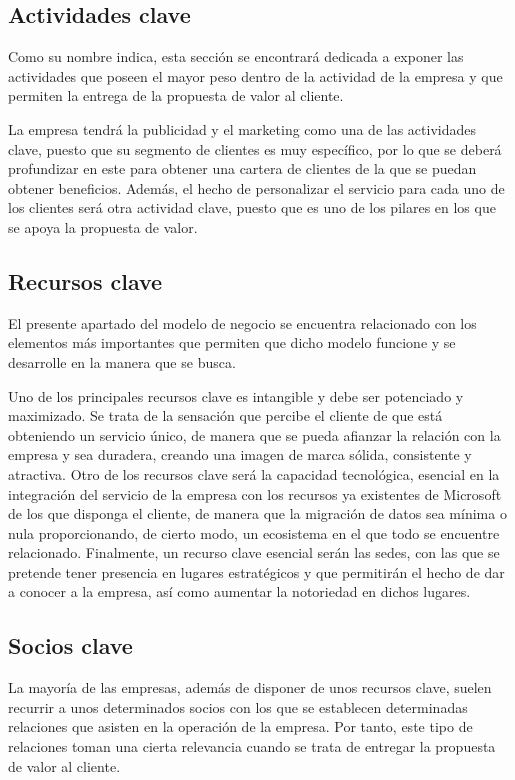 \subsection{Actividades clave}
Como su nombre indica, esta sección se encontrará dedicada a exponer las actividades que poseen el mayor peso dentro de la actividad de la empresa y que permiten la entrega de la propuesta de valor al cliente.

La empresa tendrá la publicidad y el marketing como una de las actividades clave, puesto que su segmento de clientes es muy específico, por lo que se deberá profundizar en este para obtener una cartera de clientes de la que se puedan obtener beneficios. Además, el hecho de personalizar el servicio para cada uno de los clientes será otra actividad clave, puesto que es uno de los pilares en los que se apoya la propuesta de valor.

\subsection{Recursos clave}
El presente apartado del modelo de negocio se encuentra relacionado con los elementos más importantes que permiten que dicho modelo funcione y se desarrolle en la manera que se busca.

Uno de los principales recursos clave es intangible y debe ser potenciado y maximizado. Se trata de la sensación que percibe el cliente de que está obteniendo un servicio único, de manera que se pueda afianzar la relación con la empresa y sea duradera, creando una imagen de marca sólida, consistente y atractiva. Otro de los recursos clave será la capacidad tecnológica, esencial en la integración del servicio de la empresa con los recursos ya existentes de Microsoft de los que disponga el cliente, de manera que la migración de datos sea mínima o nula proporcionando, de cierto modo, un ecosistema en el que todo se encuentre relacionado. Finalmente, un recurso clave esencial serán las sedes, con las que se pretende tener presencia en lugares estratégicos y que permitirán el hecho de dar a conocer a la empresa, así como aumentar la notoriedad en dichos lugares.

\subsection{Socios clave}
La mayoría de las empresas, además de disponer de unos recursos clave, suelen recurrir a unos determinados socios con los que se establecen determinadas relaciones que asisten en la operación de la empresa. Por tanto, este tipo de relaciones toman una cierta relevancia cuando se trata de entregar la propuesta de valor al cliente.

